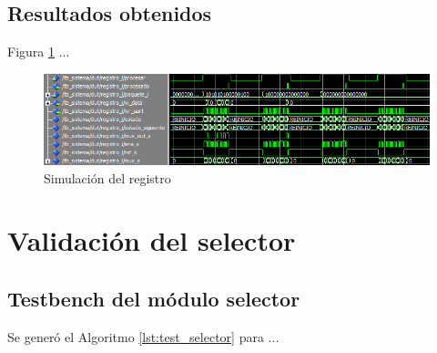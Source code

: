 	\subsection{Resultados obtenidos}
				
		Figura \ref{fig:Test_Registro} ...
		
	\begin{figure}[h]
	\centering
	\includegraphics[scale=0.7]{./Figures/Test/Registro}
		\caption{Simulación del registro}
		\label{fig:Test_Registro}
	\end{figure}
	
\section{Validación del selector}

	\subsection{Testbench del módulo selector}
			
		Se generó el Algoritmo \ref{lst:test_selector} para ...
		
